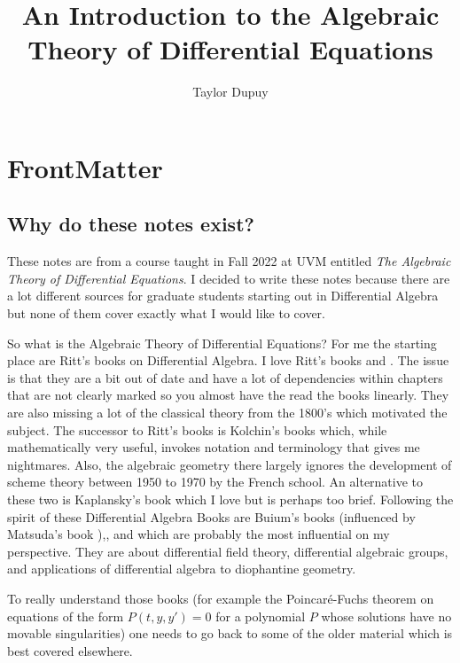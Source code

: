 \documentclass[12pt]{book}
\title{An Introduction to the Algebraic Theory of Differential Equations}
\author{Taylor Dupuy }
\numberwithin{equation}{section}
\theoremstyle{definition}
\theoremstyle{remark}
\begin{document}
\maketitle

\frontmatter

\chapter{FrontMatter}

\section*{Why do these notes exist?}
These notes are from a course taught in Fall 2022 at UVM entitled \emph{The Algebraic Theory of Differential Equations}. 
I decided to write these notes because there are a lot different sources for graduate students starting out in Differential Algebra but none of them cover exactly what I would like to cover. 

So what is the Algebraic Theory of Differential Equations? 
For me the starting place are Ritt's books on Differential Algebra. 
I love Ritt's books \cite{Ritt1932} and \cite{Ritt1950}. 
The issue is that they are a bit out of date and have a lot of dependencies within chapters that are not clearly marked so you almost have the read the books linearly. 
They are also missing a lot of the classical theory from the 1800's which motivated the subject. 
The successor to Ritt's books is Kolchin's books \cite{Kolchin1973} which, while mathematically very useful, invokes notation and terminology that gives me nightmares. 
Also, the algebraic geometry there largely ignores the development of scheme theory between 1950 to 1970 by the French school. 
An alternative to these two is Kaplansky's book \cite{Kaplansky1976} which I love but is perhaps too brief. 
Following the spirit of these Differential Algebra Books are Buium's books \cite{Buium1986} (influenced by Matsuda's book \cite{Matsuda1980}),\cite{Buium1992}, and \cite{Buium1994} which are probably the most influential on my perspective. 
They are about differential field theory, differential algebraic groups, and applications of differential algebra to diophantine geometry.

To really understand those books (for example the Poincar\'e-Fuchs theorem on equations of the form $P(t,y,y')=0$ for a polynomial $P$ whose solutions have no movable singularities) one needs to go back to some of the older material which is best covered elsewhere. 
\end{document}
